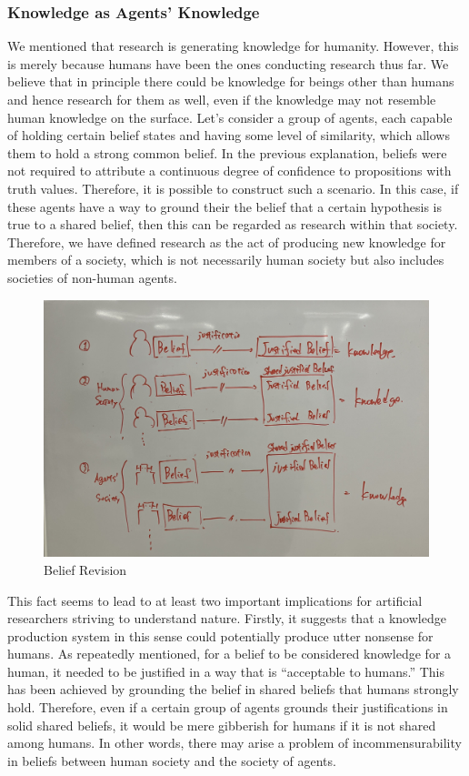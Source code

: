\subsubsection{Knowledge as Agents' Knowledge}
We mentioned that research is generating knowledge for humanity. However, this is merely because humans have been the ones conducting research thus far. We believe that in principle there could be knowledge for beings other than humans and hence research for them as well, even if the knowledge may not resemble human knowledge on the surface. Let's consider a group of agents, each capable of holding certain belief states and having some level of similarity, which allows them to hold a strong common belief. In the previous explanation, beliefs were not required to attribute a continuous degree of confidence to propositions with truth values. Therefore, it is possible to construct such a scenario. In this case, if these agents have a way to ground their the belief that a certain hypothesis is true to a shared belief, then this can be regarded as research within that society. Therefore, we have defined research as the act of producing new knowledge for members of a society, which is not necessarily human society but also includes societies of non-human agents.

\begin{figure}[htb]
    \centering
    \includegraphics[width=\linewidth]{figs/shared_belief_revision.jpg}
    \caption{Belief Revision}
    \label{fig:shared_belief_revision}
\end{figure}

This fact seems to lead to at least two important implications for artificial researchers striving to understand nature. Firstly, it suggests that a knowledge production system in this sense could potentially produce utter nonsense for humans. As repeatedly mentioned, for a belief to be considered knowledge for a human, it needed to be justified in a way that is ``acceptable to humans.'' This has been achieved by grounding the belief in shared beliefs that humans strongly hold. Therefore, even if a certain group of agents grounds their justifications in solid shared beliefs, it would be mere gibberish for humans if it is not shared among humans. In other words, there may arise a problem of incommensurability \cite{kuhn1962} in beliefs between human society and the society of agents. 

